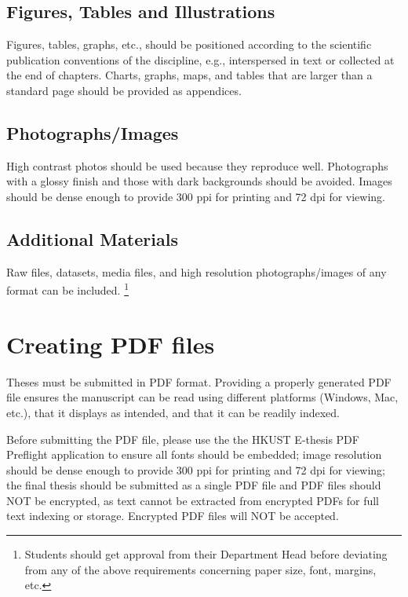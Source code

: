 \subsection{Figures, Tables and Illustrations}

Figures, tables, graphs, etc., should be positioned according to the scientific publication conventions of the discipline, e.g., interspersed in text or collected at the end of chapters. Charts, graphs, maps, and tables that are larger than a standard page should be provided as appendices.

\subsection{Photographs/Images}

High contrast photos should be used because they reproduce well. Photographs with a glossy finish and those with dark backgrounds should be avoided. Images should be dense enough to provide 300 ppi for printing and 72 dpi for viewing.

\subsection{Additional Materials}

Raw files, datasets, media files, and high resolution photographs/images of any format can be included. \footnote{Students should get approval from their Department Head before deviating from any of the above requirements concerning paper size, font, margins, etc.}

\section{Creating PDF files}

Theses must be submitted in PDF format. Providing a properly generated PDF file ensures the manuscript can be read using different platforms (Windows, Mac, etc.), that it displays as intended, and that it can be readily indexed.

Before submitting the PDF file, please use the the HKUST E-thesis PDF Preflight application to ensure all fonts should be embedded; image resolution should be dense enough to provide 300 ppi for printing and 72 dpi for viewing; the final thesis should be submitted as a single PDF file and PDF files should NOT be encrypted, as text cannot be extracted from encrypted PDFs for full text indexing or storage. Encrypted PDF files will NOT be accepted.

